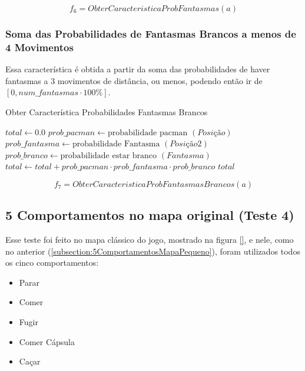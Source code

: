 $$ f_6 = ObterCaracteristicaProbFantasmas \left( a \right) $$

\subsubsection*{Soma das Probabilidades de Fantasmas Brancos a menos de 4 Movimentos}

Essa característica é obtida a partir da soma das probabilidades de haver fantasmas a 3 movimentos de distância, ou menos, podendo então ir de $ \left[ 0, num\_fantasmas \cdot 100\% \right] $.

\begin{algorithm}[H]
	\caption{Obter Característica Probabilidades Fantasmas Brancos} \label{algorithm:ObterCaracteristicaProbabilidadesFantasmasBrancos}
	\begin{algorithmic}[1]
			\State $\textit{total} \gets 0.0 $
						\State $\textit{prob\_pacman} \gets \text{probabilidade pacman } \left( \textit{Posição} \right) $
							\State $\textit{prob\_fantasma} \gets \text{probabilidade Fantasma } \left( \textit{Posição2} \right) $
							\State $\textit{prob\_branco} \gets \text{probabilidade estar branco } \left( \textit{Fantasma} \right) $
							\State $\textit{total} \gets \textit{total} + \textit{prob\_pacman}  \cdot \textit{prob\_fantasma} \cdot \textit{prob\_branco} $
						\EndFor
					\EndIf
				\EndFor
			\EndFor
			\State \Return $ \textit{total} $
		\EndProcedure
	\end{algorithmic}
\end{algorithm}

$$ f_7 = ObterCaracteristicaProbFantasmasBrancos \left( a \right) $$

\subsection{5 Comportamentos no mapa original (Teste 4)} \label{subsection:5ComportamentosMapaOriginal}

Esse teste foi feito no mapa clássico do jogo, mostrado na figura \ref{}, e nele, como no anterior (\ref{subsection:5ComportamentosMapaPequeno}), foram utilizados todos os cinco comportamentos:

\begin{itemize}
	\item Parar
	\item Comer
	\item Fugir
	\item Comer Cápsula
	\item Caçar
\end{itemize}

